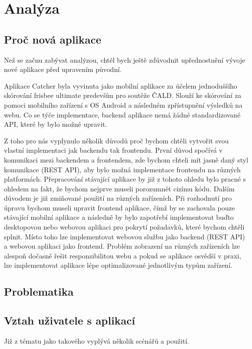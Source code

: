 \documentclass[thesis=B,czech]{FITthesis}[2012/06/26]
\begin{document}
\chapter{Analýza}

	\section{Proč nová aplikace}
		Než se začnu zabývat analýzou, chtěl bych ještě zdůvodnit upřednostnění vývoje nové aplikace před upravením původní.

		Aplikace Catcher byla vyvinuta jako mobilní aplikace za účelem jednoduššího skórování frisbee ultimate predevším pro soutěže ČALD. Slouží ke skórování za pomoci mobilního zařízení s OS Android a následném zpřístupnění výsledků na webu. Co se týče implementace, backend aplikace nemá žádné standardizované API, které by bylo možné upravit.

		Z toho pro nás vyplynulo několik důvodů proč bychom chtěli vytvořit svou vlastní implementaci jak backendu tak frontendu. První důvod spočívá v komunikaci mezi backendem a frontendem, zde bychom chteli mít jasně daný styl komunikace (REST API), aby bylo možná implementace frontendu na různých platformách. Přepracování stávající aplikace by již z tohoto ohledu bylo pracné s ohledem na fakt, že bychom nejprve museli porozumnět cizímu kódu. Dalším důvodem je již zmiňované použití na různých zařízeních. Při rozhodnutí pro úpravu bychom museli upravit frontend aplikace, čímž by se zachovala pouze stávající mobilní aplikace a následně by bylo zapotřebí implementovat buďto desktopovou nebo webovou aplikaci pro pokrytí požadavků, které bychom chtěli splnit. Místo toho lze implementovat webovou službu jako backend (REST API) a webovou aplikaci jako frontend. Problém zobrazení na různých zařízeních lze alespoň dočasně řešit responzibilitou webu a pokud se aplikace osvědší v praxi, lze implementovat aplikace lépe optimalizované jednotlivým typům zařízení.
	
	\section{Problematika}


	\section{Vztah uživatele s aplikací}
		Již z tématu jako takového vyplývá několik scénářů a použití.
\end{document}

